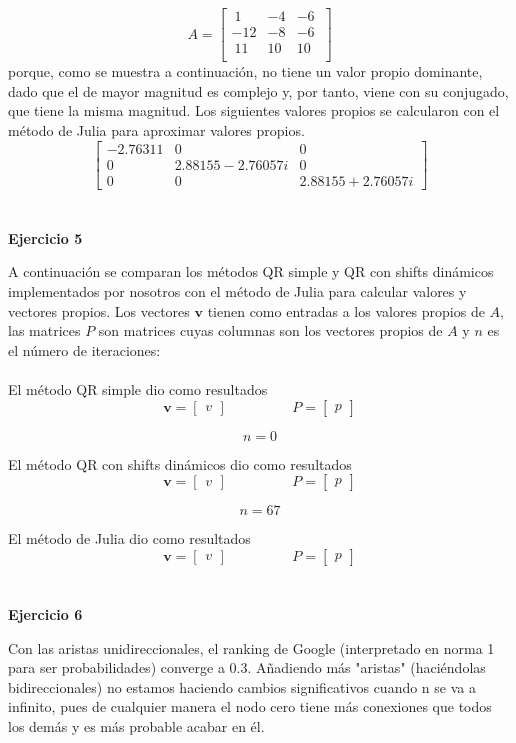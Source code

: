 \documentclass[11pt]{article}
\begin{document}
$$
A =
\begin{bmatrix}
 \ 1 & -4 & -6 \ \\
-12 & -8 & -6 \ \\
 \ 11 & 10 & 10 \ \\
\end{bmatrix}
$$
porque, como se muestra a continuación, no tiene un valor propio dominante, dado que el de mayor magnitud es complejo y, por tanto, viene con su conjugado, que tiene la misma magnitud. Los siguientes valores propios se calcularon con el método de Julia para aproximar valores propios.
$$
\begin{bmatrix}
 -2.76311 & 0 & 0 \\
 0 & 2.88155-2.76057i & 0 \\
 0 & 0 & 2.88155+2.76057i
\end{bmatrix}
$$
\\
\\

\noindent
\textbf{Ejercicio 5}


\noindent
A continuación se comparan los métodos QR simple y QR con shifts dinámicos implementados por nosotros con el método de Julia para calcular valores y vectores propios. Los vectores $\textbf{v}$ tienen como entradas a los valores propios de $A$, las matrices $P$ son matrices cuyas columnas son los vectores propios de $A$ y $n$ es el número de iteraciones:
\\
\\

El método QR simple dio como resultados
\[
 \textbf{v} =
 \begin{bmatrix}
v
\end{bmatrix}
 \qquad\text{ }\qquad
P =
 \begin{bmatrix}
p
\end{bmatrix}
 \]

 $$n = 0$$

El método QR con shifts dinámicos dio como resultados
\[
 \textbf{v} =
 \begin{bmatrix}
v
\end{bmatrix}
 \qquad\text{ }\qquad
P =
 \begin{bmatrix}
p
\end{bmatrix}
 \]

 $$n = 67$$

El método de Julia dio como resultados
\[
 \textbf{v} =
 \begin{bmatrix}
v
\end{bmatrix}
 \qquad\text{ }\qquad
P =
 \begin{bmatrix}
p
\end{bmatrix}
 \]
\\
\\

\noindent
\textbf{Ejercicio 6}

\noindent
Con las aristas unidireccionales, el ranking de Google (interpretado en norma
1 para ser probabilidades) converge a 0.3.
Añadiendo más "aristas" (haciéndolas bidireccionales) no estamos haciendo
cambios significativos cuando n se va a infinito, pues de cualquier manera
el nodo cero tiene más conexiones que todos los demás y es más probable
acabar en él.

\noindent
\end{document}

